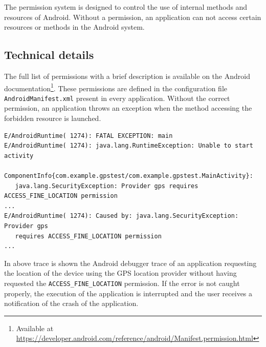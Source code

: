 The permission system is designed to control the use of internal methods and resources of Android.
Without a permission, an application can not access certain resources or methods in the Android system.

\subsection{Technical details}
The full list of permissions with a brief description is available on the Android documentation\footnote{Available at \url{https://developer.android.com/reference/android/Manifest.permission.html}}.
These permissions are defined in the configuration file \texttt{AndroidManifest.xml} present in every application.
Without the correct permission, an application throws an exception when the method accessing the forbidden resource is launched.

{\scriptsize
\begin{verbatim}
E/AndroidRuntime( 1274): FATAL EXCEPTION: main
E/AndroidRuntime( 1274): java.lang.RuntimeException: Unable to start activity
   ComponentInfo{com.example.gpstest/com.example.gpstest.MainActivity}: 
   java.lang.SecurityException: Provider gps requires ACCESS_FINE_LOCATION permission
...
E/AndroidRuntime( 1274): Caused by: java.lang.SecurityException: Provider gps
   requires ACCESS_FINE_LOCATION permission
...
\end{verbatim}
}

In above trace is shown the Android debugger trace of an application requesting the location of the device using the GPS location provider without having requested the \texttt{ACCESS\_FINE\_LOCATION} permission.
If the error is not caught properly, the execution of the application is interrupted and the user receives a notification of the crash of the application.\\

